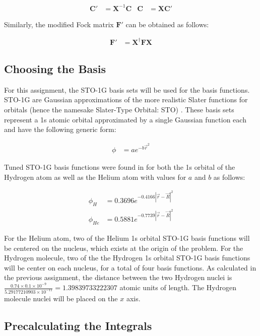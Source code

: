 \documentclass[10pt, oneside, letterpaper]{article}
\begin{document}
\begin{align*}
\bm{C}' &= \bm{X}^{-1}\bm{C} & \bm{C} &= \bm{X}\bm{C}'
\end{align*}

Similarly, the modified Fock matrix $\bm{F}'$ can be obtained as follows:

\begin{align*}
\bm{F}' &= \bm{X}^\dagger\bm{F}\bm{X}
\end{align*}

\subsection{Choosing the Basis}

For this assignment, the STO-1G basis sets will be used for the basis functions. STO-1G are Gaussian approximations of the more realistic Slater functions for orbitals (hence the namesake Slater-Type Orbital: STO) \cite{chem-libretext-gaussian-basis-sets}. These basis sets represent a 1s atomic orbital approximated by a single Gaussian function each and have the following generic form:

\begin{align*}
\phi &= ae^{-b\vec{r}^2}
\end{align*}

Tuned STO-1G basis functions were found in \cite[p.~214]{errol-comp-chem-text}\cite{hartree-fock-in-100-lines} for both the 1s orbital of the Hydrogen atom as well as the Helium atom with values for $a$ and $b$ as follows:

\begin{align*}
\phi_{H} &= 0.3696e^{-0.4166\left|\vec{r} - \vec{R}\right|^2} \\
\phi_{He} &= 0.5881e^{-0.7739\left|\vec{r} - \vec{R}\right|^2}
\end{align*}

For the Helium atom, two of the Helium 1s orbital STO-1G basis functions will be centered on the nucleus, which exists at the origin of the problem. For the Hydrogen molecule, two of the the Hydrogen 1s orbital STO-1G basis functions will be center on each nucleus, for a total of four basis functions. As calculated in the previous assignment, the distance between the two Hydrogen nuclei is $\frac{0.74 \times 0.1\times10^{-9}}{5.29177210903\times10^{-11}} = 1.39839733222307$ atomic units of length. The Hydrogen molecule nuclei will be placed on the $x$ axis.

\subsection{Precalculating the Integrals}
\end{document}
